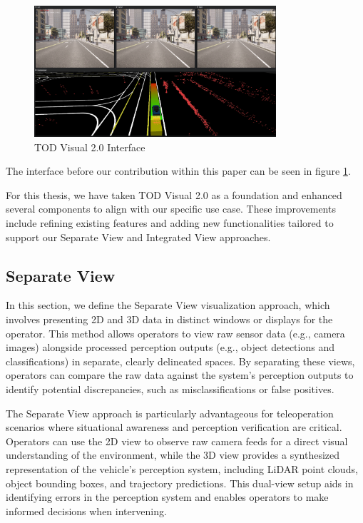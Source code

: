 \begin{figure}
    \includegraphics[width=0.8\textwidth]{figures/todvisual.png}
    \centering
    \caption{TOD Visual 2.0 Interface}
    \label{fig:TODVisual}
\end{figure}

The interface before our contribution within this paper can be seen in figure \ref{fig:TODVisual}.

For this thesis, we have taken TOD Visual 2.0 as a foundation and enhanced several components to align with our specific use case. These improvements include refining existing features and adding new functionalities tailored to support our Separate View and Integrated View approaches.


\subsection{Separate View}\label{section:separateview}
In this section, we define the Separate View visualization approach, which involves presenting 2D and 3D data in distinct windows or displays for the operator. This method allows operators to view raw sensor data (e.g., camera images) alongside processed perception outputs (e.g., object detections and classifications) in separate, clearly delineated spaces. By separating these views, operators can compare the raw data against the system's perception outputs to identify potential discrepancies, such as misclassifications or false positives.

The Separate View approach is particularly advantageous for teleoperation scenarios where situational awareness and perception verification are critical. Operators can use the 2D view to observe raw camera feeds for a direct visual understanding of the environment, while the 3D view provides a synthesized representation of the vehicle's perception system, including LiDAR point clouds, object bounding boxes, and trajectory predictions. This dual-view setup aids in identifying errors in the perception system and enables operators to make informed decisions when intervening.
